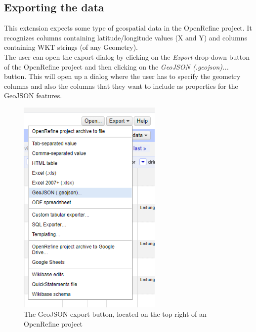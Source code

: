\subsection{Exporting the data}
This extension expects some type of geospatial data in the OpenRefine project.
It recognizes columns containing latitude/longitude values (X and Y) and columns containing WKT strings (of any Geometry).\\
\newline
The user can open the export dialog by clicking on the \textit{Export} drop-down button of the OpenRefine project and then clicking
on the \textit{GeoJSON (.geojson)...} button.
This will open up a dialog where the user has to specify the geometry columns and also the columns that they want to
include as properties for the GeoJSON features.\\
\newline

\begin{figure}[H]
    \includegraphics[width=7cm]{./Figures/GeoJSON_Export/geojson_export_button}
    \caption{The GeoJSON export button, located on the top right of an OpenRefine project}
\end{figure}

